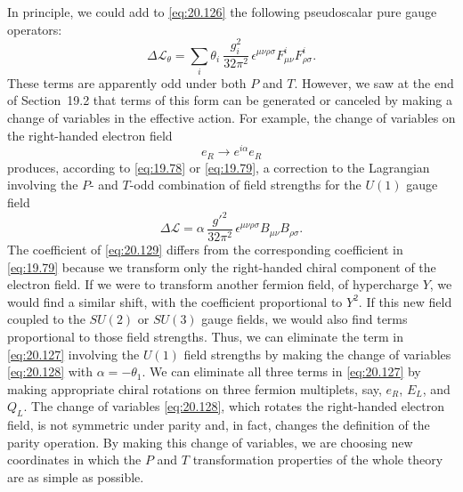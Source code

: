 In principle, we could add to \eqref{eq:20.126} the following pseudoscalar
pure gauge operators:
\begin{equation}
  \Delta\mathcal{L}_{\theta} = \sum_i \theta_i\ \frac{g_i^2}{32\pi^2}\,
    \epsilon^{\mu\nu\rho\sigma}F^i_{\mu\nu}F^i_{\rho\sigma} .
  \label{eq:20.127}
\end{equation}
These terms are apparently odd under both $P$ and $T$.  However, we saw at
the end of Section~19.2 that terms of this form can be generated or canceled
by making a change of variables in the effective action.  For example, the
change of variables on the right-handed electron field
\begin{equation}
  e_R \to e^{i\alpha}e_R
  \label{eq:20.128}
\end{equation}
produces, according to \eqref{eq:19.78} or \eqref{eq:19.79}, a correction to
the Lagrangian involving the $P$- and $T$-odd combination of field strengths
for the $U(1)$ gauge field
\begin{equation}
  \Delta\mathcal{L} = \alpha\,\frac{g'^2}{32\pi^2}\,
    \epsilon^{\mu\nu\rho\sigma}B_{\mu\nu}B_{\rho\sigma} .
  \label{eq:20.129}
\end{equation}
The coefficient of \eqref{eq:20.129} differs from the corresponding
coefficient in \eqref{eq:19.79} because we transform only the right-handed
chiral component of the electron field.  If we were to transform another
fermion field, of hypercharge $Y$, we would find a similar shift, with the
coefficient proportional to $Y^2$.  If this new field coupled to the $SU(2)$
or $SU(3)$ gauge fields, we would also find terms proportional to those field
strengths.  Thus, we can eliminate the term in \eqref{eq:20.127} involving
the $U(1)$ field strengths by making the change of variables \eqref{eq:20.128}
with $\alpha = -\theta_1$.  We can eliminate all three terms in
\eqref{eq:20.127} by making appropriate chiral rotations on three fermion
multiplets, say, $e_R$, $E_L$, and $Q_L$.  The change of variables
\eqref{eq:20.128}, which rotates the right-handed electron field, is not
symmetric under parity and, in fact, changes the definition of the parity
operation.  By making this change of variables, we are choosing new
coordinates in which the $P$ and $T$ transformation properties of the whole
theory are as simple as possible.


